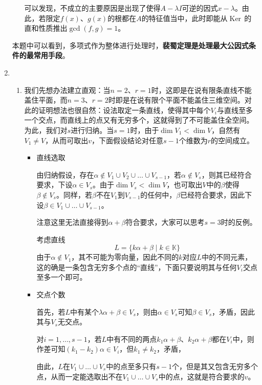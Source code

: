 \documentclass[a4paper,UTF8,fontset=windows,AutoFakeBold]{ctexart}
\DeclareMathOperator{\Ker}{Ker\,}
\newcommand*{\note}{\noindent *}
\begin{document}
\begin{enumerate}
\begin{itemize}
        \note 可以发现，不成立的主要原因是出现了使得$A-\lambda I$可逆的因式$x-\lambda$。由此，若限定$f(x)$、$g(x)$的根都在$A$的特征值当中，此时即能从$\Ker$的直和性质推出$\gcd(f,g)=1$。
    \end{itemize}

    \note 本题中可以看到，多项式作为整体进行处理时，\textbf{裴蜀定理是处理最大公因式条件的最常用手段}。

    \item
    \begin{enumerate}
        \item 
        我们先想办法建立直观：当$n=2$、$r=1$时，这即是在说有限条直线不能盖住平面，而$n=3$、$r=2$时即是在说有限个平面不能盖住三维空间。对此的证明想法也很自然：设法取定一条直线，使得其中每个$V_i$与直线至多一个交点，而直线上的点又有无穷多个，这就得到了不可能盖住全空间。为此，我们对$s$进行归纳。当$s=1$时，由于$\dim V_1<\dim V$，自然有$V_1\ne V$，从而可取出$v$，下面假设结论对任意$s-1$个维数为$r$的空间成立。

        \begin{itemize}
            \item 直线选取
            
            由归纳假设，存在$\alpha\notin V_1\cup V_2\cup\dots\cup V_{s-1}$，若$\alpha\notin V_s$，则其已经符合要求，下设$\alpha\in V_s$。由于$\dim V_s<\dim V$，也可取出$V$中的$\beta$使得$\beta\notin V_s$。同样，若$\beta$不在$V_1$到$V_{s-1}$的任何中，$\beta$已经符合要求，因此下设$\beta\in V_1\cup\dots\cup V_{s-1}$。

            \note 注意这里无法直接得到$\alpha+\beta$符合要求，大家可以思考$s=3$时的反例。

            考虑直线
            $$L=\{k\alpha+\beta\mid k\in\mathbb{K}\}$$
            由于$\alpha\notin V_1$，其不可能为零向量，因此不同的$k$对应$L$中的不同元素，这的确是一条包含无穷多个点的``直线''，下面只要说明其与任何$V_i$交点至多一个即可。

            \item 交点个数
            
            首先，若$L$中有某个$\lambda\alpha+\beta\in V_s$，则由$\alpha\in V_s$可知$\beta\in V_s$，矛盾，因此其与$V_s$无交点。

            对$i=1,\dots,s-1$，若$L$中有不同的两点$k_1\alpha+\beta$、$k_2\alpha+\beta$都在$V_i$中，则作差可知$(k_1-k_2)\alpha\in V_i$，但$k_1\ne k_2$，矛盾，

            由此，$L$在$V_1\cup\dots\cup V_s$中的点至多只有$s-1$个，但是其又包含无穷多个点，从而一定能选取出不在$V_1\cup\dots\cup V_s$中的点，这就是符合要求的$v$。
        \end{itemize}


\end{enumerate}
\end{enumerate}
\end{document}
